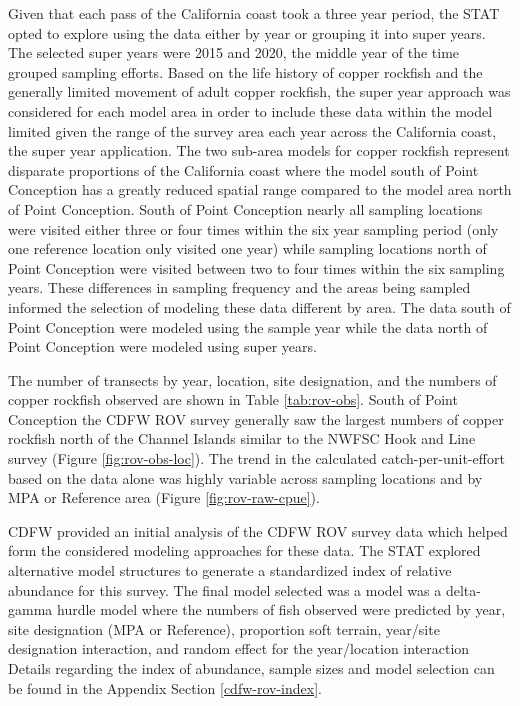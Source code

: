 \documentclass[11pt,
  english,
  letterpaper,
]{article}
\begin{document}
Given that each pass of the California coast took a three year period, the STAT opted to explore using the data either by year or grouping it into super years. The selected super years were 2015 and 2020, the middle year of the time grouped sampling efforts. Based on the life history of copper rockfish and the generally limited movement of adult copper rockfish, the super year approach was considered for each model area in order to include these data within the model limited given the range of the survey area each year across the California coast, the super year application. The two sub-area models for copper rockfish represent disparate proportions of the California coast where the model south of Point Conception has a greatly reduced spatial range compared to the model area north of Point Conception. South of Point Conception nearly all sampling locations were visited either three or four times within the six year sampling period (only one reference location only visited one year) while sampling locations north of Point Conception were visited between two to four times within the six sampling years. These differences in sampling frequency and the areas being sampled informed the selection of modeling these data different by area. The data south of Point Conception were modeled using the sample year while the data north of Point Conception were modeled using super years.

The number of transects by year, location, site designation, and the numbers of copper rockfish observed are shown in Table \ref{tab:rov-obs}. South of Point Conception the CDFW ROV survey generally saw the largest numbers of copper rockfish north of the Channel Islands similar to the NWFSC Hook and Line survey (Figure \ref{fig:rov-obs-loc}). The trend in the calculated catch-per-unit-effort based on the data alone was highly variable across sampling locations and by MPA or Reference area (Figure \ref{fig:rov-raw-cpue}).

CDFW provided an initial analysis of the CDFW ROV survey data which helped form the considered modeling approaches for these data. The STAT explored alternative model structures to generate a standardized index of relative abundance for this survey. The final model selected was a model was a delta-gamma hurdle model where the numbers of fish observed were predicted by year, site designation (MPA or Reference), proportion soft terrain, year/site designation interaction, and random effect for the year/location interaction Details regarding the index of abundance, sample sizes and model selection can be found in the Appendix Section \ref{cdfw-rov-index}.
\end{document}
